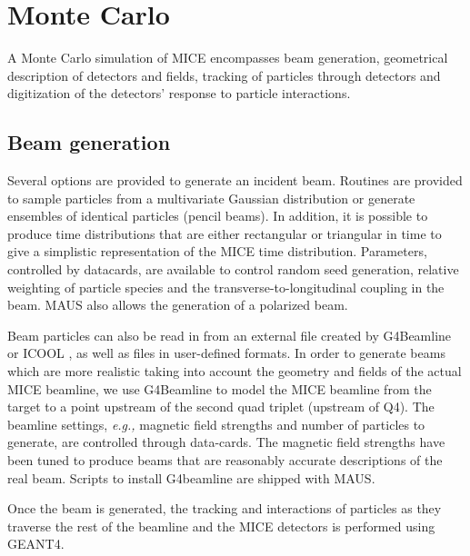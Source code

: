 \documentclass{JINST}
\begin{document}

\section{Monte Carlo}\label{sec:mc}
A Monte Carlo simulation of MICE encompasses beam generation, geometrical description of detectors  and fields, tracking of particles through detectors and digitization of the detectors' response to particle interactions. 

\subsection{Beam generation}\label{sec:beam}
Several options are provided to generate an incident beam.  Routines are provided to sample particles from a multivariate Gaussian distribution or generate ensembles of identical particles (pencil beams). In addition, it is possible to produce time distributions that are either rectangular or triangular in time to give a simplistic representation of the MICE time distribution. Parameters, controlled by datacards, are available to control random seed generation,  relative weighting of particle species and the transverse-to-longitudinal coupling in the beam. MAUS also allows the generation of a polarized beam. 

Beam particles can also be read in from an external file created by G4Beamline \cite{G4Beamline} or ICOOL \cite{ICOOL}, as well as files in user-defined formats. In order to generate beams which are more realistic taking into account the geometry and fields of the actual MICE beamline, we use G4Beamline to model the MICE beamline from the target to a point upstream of the second quad triplet (upstream of Q4).  The beamline settings, \textit{e.g.,} magnetic field strengths and number of particles to generate, are controlled through data-cards. The magnetic field strengths have been tuned to produce beams that are reasonably accurate descriptions of the real beam. Scripts to install G4beamline are shipped with MAUS. 

Once the beam is generated, the tracking and interactions of particles as they traverse the rest of the beamline and the MICE detectors  is performed using GEANT4.
\end{document}
